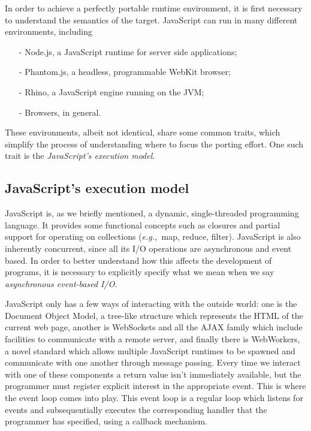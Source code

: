 \documentclass{sig-alternate}
\newcommand{\eg}{{\em e.g.,~}}
\begin{document}
In order to achieve a perfectly portable runtime environment, it is first necessary to understand the semantics of the target.
JavaScript can run in many different environments, including
\begin{itemize}
\item[-]{Node.js, a JavaScript runtime for server side applications;}
\item[-]{Phantom.js, a headless, programmable WebKit browser;}
\item[-]{Rhino, a JavaScript engine running on the JVM;}
\item[-]{Browsers, in general.}
\end{itemize}
These environments, albeit not identical, share some common traits, which simplify the process of understanding where to focus the porting effort. One such trait is the \textit{JavaScript's execution model}.

\subsection{JavaScript's execution model}

JavaScript is, as we briefly mentioned, a dynamic, single-threaded programming language. It provides some functional concepts such as closures and partial support for operating on collections (\eg map, reduce, filter).
JavaScript is also inherently concurrent, since all its I/O operations are asynchronous and event based.
In order to better understand how this affects the development of programs, it is necessary to explicitly specify what we mean when we say \textit{asynchronous event-based I/O}.

JavaScript only has a few ways of interacting with the outside world: one is the Document Object Model, a tree-like structure which represents the HTML of the current web page, another is WebSockets and all the AJAX family which include facilities to communicate with a remote server, and finally there is WebWorkers, a novel standard which allows multiple JavaScript runtimes to be spawned and communicate with one another through message passing.
Every time we interact with one of these components a return value isn't immediately available, but the programmer must register explicit interest in the appropriate event. This is where the event loop comes into play. This event loop is a regular loop which listens for events and subsequentially executes the corresponding handler that the programmer has specified, using a callback mechanism.
\end{document}
